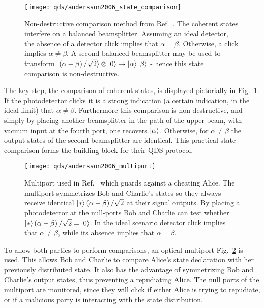 \begin{figure}[htp]
\centering
\texttt{[image: qds/andersson2006\_state\_comparison]}
\caption{\label{fig:andersson2006_state_comparison} Non-destructive comparison method from Ref.~\cite{Andersson2006}. The coherent states interfere on a balanced beamsplitter. Assuming an ideal detector, the absence of a detector click implies that $\alpha = \beta$. Otherwise, a click implies $\alpha \ne \beta$. A second balanced beamsplitter may be used to transform $\ket{\left(\alpha+\beta\right)/\sqrt{2}}\otimes\ket{0}\rightarrow\ket{\alpha}\ket{\beta}$ - hence this state comparison is non-destructive.}
\end{figure}

The key step, the comparison of coherent states, is displayed pictorially in Fig.~\ref{fig:andersson2006_state_comparison}. If the photodetector clicks it is a strong indication (a certain indication, in the ideal limit) that $\alpha \ne \beta$. Furthermore this comparison is non-destructive, and simply by placing another beamsplitter in the path of the upper beam, with vacuum input at the fourth port, one recovers $\ket{\alpha}$. Otherwise, for $\alpha \ne \beta$ the output states of the second beamsplitter are identical. This practical state comparison forms the building-block for their QDS protocol. 

\begin{figure}[htp]
\centering
\texttt{[image: qds/andersson2006\_multiport]}
\caption{\label{fig:andersson2006_multiport} Multiport used in Ref.~\cite{Andersson2006} which guards against a cheating Alice. The multiport symmetrizes Bob and Charlie's states so they always receive identical $\ket*{\left(\alpha+\beta\right)/\sqrt{2}}$ at their signal outputs. By placing a photodetector at the null-ports Bob and Charlie can test whether $\ket*{\left(\alpha-\beta\right)/\sqrt{2}} = \ket{0}$. In the ideal scenario detector click implies that $\alpha\ne\beta$, while its absence implies that $\alpha = \beta$. }
\end{figure}

To allow both parties to perform comparisons, an optical multiport Fig.~\ref{fig:andersson2006_multiport} is used. This allows Bob and Charlie to compare Alice's state declaration with her previously distributed state. It also has the advantage of symmetrizing Bob and Charlie's output states, thus preventing a repudiating Alice. The null ports of the multiport are monitored, since they will click if either Alice is trying to repudiate, or if a malicious party is interacting with the state distribution.

